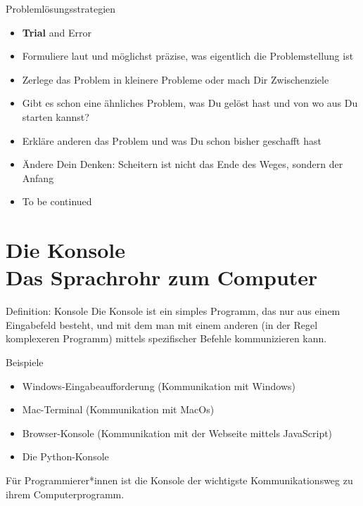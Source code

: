 \begin{frame}
\begin{block}{Problemlösungsstrategien}
	\pause 
	\begin{itemize}[<+->]
		\item \textbf{Trial} and Error
		\item Formuliere laut und möglichst präzise, was eigentlich die Problemstellung ist
		\item Zerlege das Problem in kleinere Probleme oder mach Dir Zwischenziele
		\item Gibt es schon eine ähnliches Problem, was Du gelöst hast und von wo aus Du starten kannst?
		\item Erkläre anderen das Problem und was Du schon bisher geschafft hast
		\item Ändere Dein Denken: Scheitern ist nicht das Ende des Weges, sondern der Anfang
		\item To be continued
	\end{itemize}
\end{block}
\end{frame}



\section{Die Konsole \\ \footnotesize{Das Sprachrohr zum Computer}}


\begin{frame}

\begin{block}{Definition: Konsole}
	\vspace{2pt}
	Die Konsole ist ein simples Programm, das nur aus einem Eingabefeld besteht, und mit dem man mit einem anderen (in der Regel komplexeren Programm) mittels spezifischer Befehle kommunizieren kann. 
\end{block}

\vspace{10pt}

\pause 


\begin{exampleblock}{Beispiele}
	\begin{itemize}
		\item Windows-Eingabeaufforderung (Kommunikation mit Windows)
		\item Mac-Terminal (Kommunikation mit MacOs)
		\item Browser-Konsole (Kommunikation mit der Webseite mittels JavaScript)
		\item Die Python-Konsole
	\end{itemize}
\end{exampleblock}

\pause 

	Für Programmierer*innen ist die Konsole der wichtigste Kommunikationsweg zu ihrem Computerprogramm. 
\end{frame}


